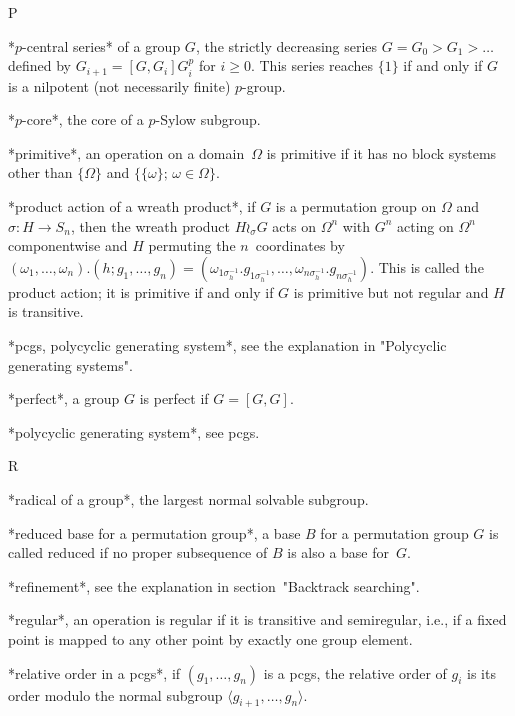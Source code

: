  P

*$p$-central series* of a group $G$, the strictly  decreasing series $G =
G_0 > G_1 > \ldots$ defined by $G_{i+1} = [G,G_i]G_i^p$ for $i\ge0$. This
series reaches $\{1\}$ if and only if $G$ is a nilpotent (not necessarily
finite) $p$-group.

*$p$-core*, the core of a $p$-Sylow subgroup.

*primitive*, an operation on a domain~$\Omega$ is primitive  if it has no
block  systems other  than   $\{\Omega\}$  and  $\{\{\omega\};\,\omega\in
\Omega\}$.

*product  action of a wreath  product*, if $G$  is a permutation group on
$\Omega$  and    $\sigma\colon H\to    S_n$,   then  the  wreath  product
$H\wr_\sigma G$ acts   on  $\Omega^n$ with  $G^n$  acting on   $\Omega^n$
componentwise     and      $H$  permuting     the    $n$~coordinates   by
$(\omega_1,\ldots,\omega_n).               (h;g_1,\ldots,g_n)           =
(\omega_{1\sigma_h^{-1}}.             g_{1\sigma_h^{-1}},         \ldots,
\omega_{n\sigma_h^{-1}}. g_{n\sigma_h^{-1}})$. This is called the product
action; it is primitive if  and only if  $G$ is primitive but not regular
and $H$ is transitive.

*pcgs, polycyclic generating  system*, see the explanation in "Polycyclic
generating systems".

*perfect*, a group $G$ is perfect if $G=[G,G]$.

*polycyclic generating system*, see pcgs.

 R

*radical of a group*, the largest normal solvable subgroup.

*reduced  base  for a permutation group*,  a  base  $B$ for a permutation
group  $G$ is called reduced  if no proper subsequence of  $B$  is also a
base for~$G$.

*refinement*, see the explanation in section~"Backtrack searching".

*regular*, an  operation is regular if  it is transitive and semiregular,
i.e., if a fixed point is mapped to any other point  by exactly one group
element.

*relative order in a pcgs*, if $(g_1,\ldots,g_n)$ is a pcgs, the relative
order    of $g_i$   is   its    order     modulo the  normal     subgroup
$\langle g_{i+1},\ldots,g_n\rangle$.

